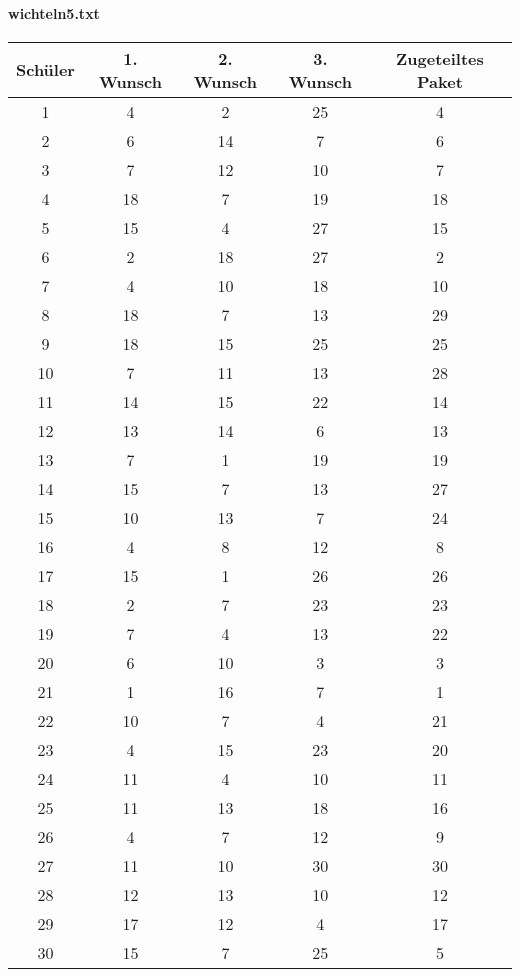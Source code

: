 \documentclass[a4paper,10pt,ngerman]{scrartcl}
\begin{document}
\paragraph{wichteln5.txt}
\begin{longtable}[c]{c|c|c|c|c}
    Schüler & 1. Wunsch & 2. Wunsch & 3. Wunsch & Zugeteiltes Paket \\
    \hline
    \endhead
    1 & 4 & 2 & 25 & 4 \\
    2 & 6 & 14 & 7 & 6 \\
    3 & 7 & 12 & 10 & 7 \\
    4 & 18 & 7 & 19 & 18 \\
    5 & 15 & 4 & 27 & 15 \\
    6 & 2 & 18 & 27 & 2 \\
    7 & 4 & 10 & 18 & 10 \\
    8 & 18 & 7 & 13 & 29 \\
    9 & 18 & 15 & 25 & 25 \\
    10 & 7 & 11 & 13 & 28 \\
    11 & 14 & 15 & 22 & 14 \\
    12 & 13 & 14 & 6 & 13 \\
    13 & 7 & 1 & 19 & 19 \\
    14 & 15 & 7 & 13 & 27 \\
    15 & 10 & 13 & 7 & 24 \\
    16 & 4 & 8 & 12 & 8 \\
    17 & 15 & 1 & 26 & 26 \\
    18 & 2 & 7 & 23 & 23 \\
    19 & 7 & 4 & 13 & 22 \\
    20 & 6 & 10 & 3 & 3 \\
    21 & 1 & 16 & 7 & 1 \\
    22 & 10 & 7 & 4 & 21 \\
    23 & 4 & 15 & 23 & 20 \\
    24 & 11 & 4 & 10 & 11 \\
    25 & 11 & 13 & 18 & 16 \\
    26 & 4 & 7 & 12 & 9 \\
    27 & 11 & 10 & 30 & 30 \\
    28 & 12 & 13 & 10 & 12 \\
    29 & 17 & 12 & 4 & 17 \\
    30 & 15 & 7 & 25 & 5
\end{longtable}
\end{document}
